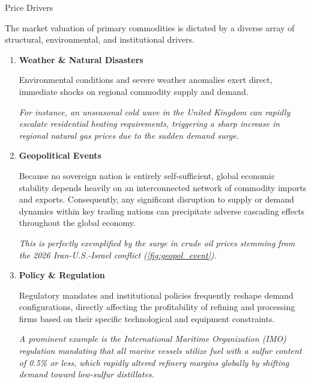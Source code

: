 \documentclass[10pt]{article}
\begin{document}
    \begin{core}{Price Drivers}

      The market valuation of primary commodities is dictated by a diverse array of structural, environmental, and institutional drivers.

      \begin{enumerate}

        \item \textbf{Weather \& Natural Disasters}

        Environmental conditions and severe weather anomalies exert direct, immediate shocks on regional commodity supply and demand. 

        \textit{For instance, an unseasonal cold wave in the United Kingdom can rapidly escalate residential heating requirements, triggering a sharp increase in regional natural gas prices due to the sudden demand surge.}

        \item \textbf{Geopolitical Events}

        Because no sovereign nation is entirely self-sufficient, global economic stability depends heavily on an interconnected network of commodity imports and exports. Consequently, any significant disruption to supply or demand dynamics within key trading nations can precipitate adverse cascading effects throughout the global economy.

        \textit{This is perfectly exemplified by the surge in crude oil prices stemming from the 2026 Iran-U.S.-Israel conflict (\autoref{fig:geopol_event}).}

        \item \textbf{Policy \& Regulation}

        Regulatory mandates and institutional policies frequently reshape demand configurations, directly affecting the profitability of refining and processing firms based on their specific technological and equipment constraints. 


        \textit{A prominent example is the International Maritime Organization (IMO) regulation mandating that all marine vessels utilize fuel with a sulfur content of 0.5\% or less, which rapidly altered refinery margins globally by shifting demand toward low-sulfur distillates.}


\end{enumerate}
\end{core}
\end{document}

